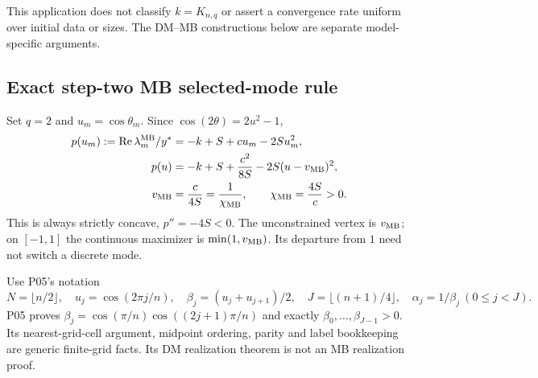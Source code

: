 This application does not classify $k=K_{n,q}$ or assert a convergence
rate uniform over initial data or sizes. The DM--MB constructions below
are separate model-specific arguments.

\subsection{Exact step-two MB selected-mode rule}
\label{slot:P08-2}
Set $q=2$ and $u_m=\cos\theta_m$. Since $\cos(2\theta)=2u^2-1$,
\begin{align}
 p(u_m):=\operatorname{Re}\lambda_m^{\mathrm{MB}}/y^*&=-k+S+cu_m-2Su_m^2,
 \label{eq:P08-quadratic}\\
 p(u)&=-k+S+\frac{c^2}{8S}-2S(u-v_{\mathrm{MB}})^2,\nonumber\\
 v_{\mathrm{MB}}&=\frac{c}{4S}=\frac1{\chi_{\mathrm{MB}}},\qquad
 \chi_{\mathrm{MB}}=\frac{4S}{c}>0.\label{eq:P08-vertex}
\end{align}
This is always strictly concave, $p''=-4S<0$. The unconstrained vertex
is $v_{\mathrm{MB}}$; on $[-1,1]$ the continuous maximizer is
$\min(1,v_{\mathrm{MB}})$. Its departure from $1$ need not switch a discrete mode.

Use P05's notation
\[
 N=\lfloor n/2\rfloor,\quad u_j=\cos(2\pi j/n),\quad
 \beta_j=(u_j+u_{j+1})/2,\quad J=\lfloor(n+1)/4\rfloor,
 \quad\alpha_j=1/\beta_j\ (0\le j<J).
\]
P05 proves $\beta_j=\cos(\pi/n)\cos((2j+1)\pi/n)$ and exactly
$\beta_0,\ldots,\beta_{J-1}>0$. Its nearest-grid-cell argument,
midpoint ordering, parity and label bookkeeping are generic finite-grid
facts. Its DM realization theorem is not an MB realization proof.

